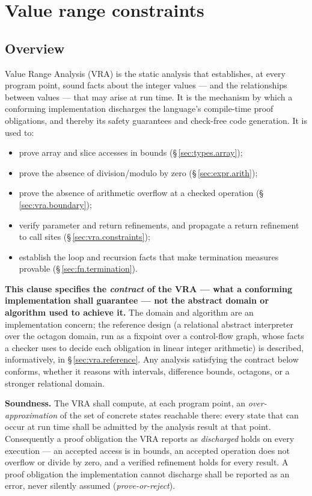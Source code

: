 \chapter{Value range constraints}
\label{sec:13-vra}

\section{Overview}
\label{sec:vra.overview}

\pnum
Value Range Analysis (VRA) is the static analysis that establishes, at every
program point, sound facts about the integer values --- and the relationships
between values --- that may arise at run time.  It is the mechanism by which a
conforming implementation discharges the language's compile-time proof
obligations, and thereby its safety guarantees and check-free code generation.
It is used to:
\begin{itemize}
  \item prove array and slice accesses in bounds (\S\,\ref{sec:types.array});
  \item prove the absence of division/modulo by zero (\S\,\ref{sec:expr.arith});
  \item prove the absence of arithmetic overflow at a checked operation
        (\S\,\ref{sec:vra.boundary});
  \item verify parameter and return refinements, and propagate a return
        refinement to call sites (\S\,\ref{sec:vra.constraints});
  \item establish the loop and recursion facts that make termination measures
        provable (\S\,\ref{sec:fn.termination}).
\end{itemize}

\pnum
\textbf{This clause specifies the \emph{contract} of the VRA --- what a
conforming implementation shall guarantee --- not the abstract domain or
algorithm used to achieve it.}  The domain and algorithm are an implementation
concern; the reference design (a relational abstract interpreter over the
octagon domain, run as a fixpoint over a control-flow graph, whose facts a
checker uses to decide each obligation in linear integer arithmetic) is
described, informatively, in \S\,\ref{sec:vra.reference}.  Any analysis satisfying the contract below
conforms, whether it reasons with intervals, difference bounds, octagons, or a
stronger relational domain.

\begin{constraint}
  \textbf{Soundness.}
  The VRA shall compute, at each program point, an \emph{over-approximation} of
  the set of concrete states reachable there: every state that can occur at run
  time shall be admitted by the analysis result at that point.  Consequently a
  proof obligation the VRA reports as \emph{discharged} holds on every
  execution --- an accepted access is in bounds, an accepted operation does not
  overflow or divide by zero, and a verified refinement holds for every result.
  A proof obligation the implementation cannot discharge shall be reported as an
  error, never silently assumed (\emph{prove-or-reject}).
\end{constraint}

